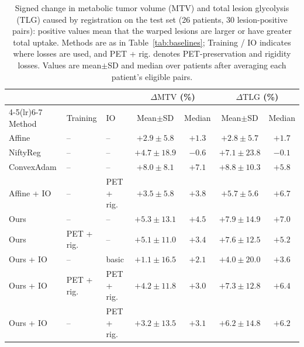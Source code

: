 \begin{table}[t]
\centering
\caption{Signed change in metabolic tumor volume (MTV) and total lesion glycolysis (TLG) caused by registration on the test set (26 patients, 30 lesion-positive pairs): positive values mean that the warped lesions are larger or have greater total uptake.
Methods are as in Table~\ref{tab:baselines}; Training / IO indicates where losses are used, and PET + rig. denotes PET-preservation and rigidity losses.
Values are mean$\pm$SD and median over patients after averaging each patient's eligible pairs.}
\label{tab:signed}
\small
\begin{tabular}{lllcccc}
\toprule
 & & & \multicolumn{2}{c}{$\Delta\mathrm{MTV}$ (\%)} & \multicolumn{2}{c}{$\Delta\mathrm{TLG}$ (\%)} \\
\cmidrule(lr){4-5}\cmidrule(lr){6-7}
Method & Training & IO & Mean$\pm$SD & Median & Mean$\pm$SD & Median \\
\midrule
Affine & -- & -- & $+2.9\pm5.8$ & $+1.3$ & $+2.8\pm5.7$ & $+1.7$ \\
NiftyReg & -- & -- & $+4.7\pm18.9$ & $-0.6$ & $+7.1\pm23.8$ & $-0.1$ \\
ConvexAdam & -- & -- & $+8.0\pm8.1$ & $+7.1$ & $+8.8\pm10.3$ & $+5.8$ \\
Affine + IO & -- & PET + rig. & $+3.5\pm5.8$ & $+3.8$ & $+5.7\pm5.6$ & $+6.7$ \\
\midrule
Ours & -- & -- & $+5.3\pm13.1$ & $+4.5$ & $+7.9\pm14.9$ & $+7.0$ \\
Ours & PET + rig. & -- & $+5.1\pm11.0$ & $+3.4$ & $+7.6\pm12.5$ & $+5.2$ \\
Ours + IO & -- & basic & $+1.1\pm16.5$ & $+2.1$ & $+4.0\pm20.0$ & $+3.6$ \\
Ours + IO & PET + rig. & PET + rig. & $+4.2\pm11.8$ & $+3.0$ & $+7.3\pm12.8$ & $+6.4$ \\
Ours + IO & -- & PET + rig. & $+3.2\pm13.5$ & $+3.1$ & $+6.2\pm14.8$ & $+6.2$ \\
\bottomrule
\end{tabular}
\end{table}
